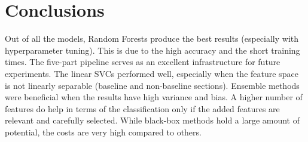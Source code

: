 \section{Conclusions}
Out of all the models, Random Forests produce the best results (especially with hyperparameter tuning). This is due to the high accuracy and the short training times. The five-part pipeline serves as an excellent infrastructure for future experiments. The linear SVCs performed well, especially when the feature space is not linearly separable (baseline and non-baseline sections). Ensemble methods were beneficial when the results have high variance and bias. A higher number of features do help in terms of the classification only if the added features are relevant and carefully selected. While black-box methods hold a large amount of potential, the costs are very high compared to others.
